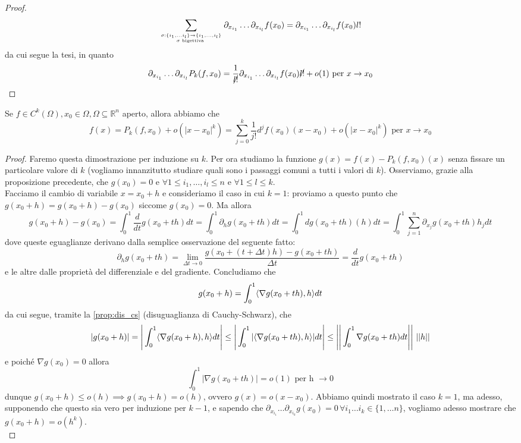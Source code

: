 \begin{proof}
$$
\sum_{\sigma: \{i_1, \ldots i_l \} \to \{ i_1, \ldots, i_l \} \atop \sigma \text{ bigettiva }} \partial_{x_{i_1}} \ldots \partial_{x_{i_l}} f(x_0) = \partial_{x_{i_1}} \ldots \partial_{x_{i_l}} f(x_0) l!
$$
da cui segue la tesi, in quanto
$$
\partial_{x_{i_1}} \ldots \partial_{x_{i_l}} P_k(f, x_0) = \frac{1}{\cancel{l!}} \partial_{x_{i_1}} \ldots \partial_{x_{i_l}} f(x_0) \cancel{l!} + o(1) \text{ per } x \to x_0
$$
\end{proof}
\begin{theorem}
Se $f \in C^k ( \Omega ), x_0 \in \Omega, \Omega \subseteq \mathbb{R}^n$ aperto, allora abbiamo che
$$
f(x) = P_k(f, x_0) + o(|x-x_0|^k) = \sum_{j=0}^k \frac{1}{j!} d^j f(x_0)(x-x_0) + o(|x-x_0|^k) \text{ per } x \to x_0
$$
\label{thm:form_taylor}
\end{theorem}
\begin{proof}
Faremo questa dimostrazione per induzione su $k$. Per ora studiamo la funzione $g(x)=f(x)-P_k(f, x_0)(x)$ senza fissare un particolare valore di $k$ (vogliamo innanzitutto studiare quali sono i passaggi comuni a tutti i valori di $k$). Osserviamo, grazie alla proposizione precedente, che $g(x_0) = 0$ e $\forall 1 \leq i_1, \ldots, i_l \leq n$ e $\forall 1 \leq l \leq k$. \\
Facciamo il cambio di variabile $x = x_0 + h$ e consideriamo il caso in cui $k=1$: proviamo a questo punto che $g(x_0+h) = g(x_0 + h) - g(x_0)$ siccome $g(x_0) = 0$. Ma allora
$$
g(x_0 + h) - g(x_0) = \int_0^1 \frac{d}{dt} g(x_0 + th)dt = \int_0^1 \partial_h g(x_0 + th)dt = \int_0^1 dg(x_0 + th)(h)dt = \int_0^1 \sum_{j=1}^n \partial_{x_j} g(x_0 + th) h_j dt
$$
dove queste eguaglianze derivano dalla semplice osservazione del seguente fatto:
$$
\partial_h g(x_0 + th) = \lim_{\Delta t \to 0} \frac{g(x_0 + (t+\Delta t)h) - g(x_0 + th)}{\Delta t} = \frac{d}{dt} g(x_0 + th)
$$
e le altre dalle proprietà del differenziale e del gradiente. Concludiamo che
$$
g(x_0 + h) = \int_{0}^1 \langle \nabla g(x_0 + th), h \rangle dt
$$
da cui segue, tramite la \ref{prop:dis_cs} (disuguaglianza di Cauchy-Schwarz), che 
$$
|g(x_0 + h)| = \Bigg| \int_{0}^1 \langle \nabla g(x_0 + h), h \rangle dt  \Bigg| \leq \Bigg| \int_{0}^{1} | \langle \nabla g(x_0+th), h \rangle|dt \Bigg| \leq \Bigg| \Bigg| \int_0^1 \nabla g(x_0 + th) dt \Bigg| \Bigg| \, \, || h ||
$$
e poiché $\nabla g(x_0) = 0$ allora
$$
\int_0^1 |\nabla g(x_0 + th)| = o(1) \, \, \text{per h } \to 0
$$
dunque $g(x_0 + h) \leq o(h) \implies g(x_0 + h) = o(h)$, ovvero $g(x)=o(x-x_0)$. Abbiamo quindi mostrato il caso $k=1$, ma adesso, supponendo che questo sia vero per induzione per $k-1$, e sapendo che $\partial_{x_{i_1}} \ldots \partial_{x_{i_k}} g(x_0) = 0 \, \forall i_1 \ldots i_k \in \{1, \ldots n \}$, vogliamo adesso mostrare che $g(x_0 + h) = o(h^{k})$. \\

\end{proof}
